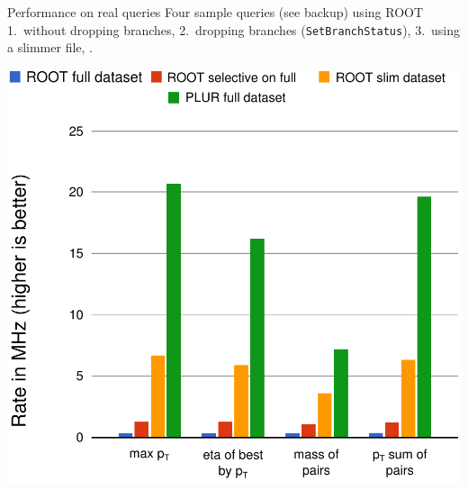 \documentclass{beamer}
\begin{document}




\begin{frame}{Performance on real queries}
\vspace{0.35 cm}
Four sample queries (see backup) using ROOT \textcolor{results1}{1.~without dropping branches}, \textcolor{results2}{2.~dropping branches ({\tt\small SetBranchStatus})}, \textcolor{results3}{3.~using a slimmer file}, \textcolor{results4}{}.

\begin{center}
\includegraphics[width=0.65\linewidth]{root-and-plur.pdf}
\end{center}
\end{frame}
\end{document}
